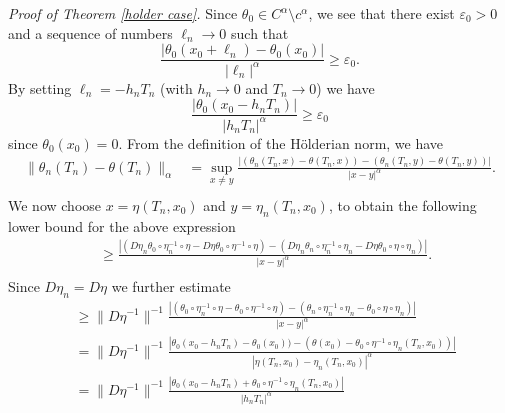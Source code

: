 \documentclass[11pt]{amsart}
\numberwithin{equation}{section}
\begin{document}
\noindent
{\it Proof of Theorem \ref{holder case}.}\quad 
Since   $\theta_0\in  C^\alpha\setminus c^\alpha$, 
we see that 
there exist $\varepsilon_0 >0$ 
and a sequence of numbers 
$\ell_n \to 0$ such that 
% 
\[ 
\frac{\lvert \theta_0(x_0+ \ell_n) - \theta_0(x_0) \rvert} {\lvert \ell_n \rvert^{\alpha}} \ge \varepsilon_0. 
\] 
% 
By setting $\ell_n=-h_nT_n$ 
(with $h_n\to 0$ and $T_n\to 0$) we have
% 
\[ 
\frac{\lvert \theta_0(x_0- h_nT_n)\rvert}{\lvert h_nT_n \rvert^{\alpha}} \ge \varepsilon_0 
\] 
% 
since $\theta_0(x_0)=0$. 
From the definition of the H\"olderian norm, we have  
% 
\begin{equation*} 
\begin{split} 
\|\theta_n(T_n)-\theta(T_n)\|_{\alpha} 
&= 
\sup_{x\not=y} 
\frac{|(\theta_{n}(T_n,x)-\theta(T_n,x))-(\theta_{n}(T_n,y)-\theta(T_n,y))|}{|x-y|^\alpha}. 
\\ 
\end{split} 
\end{equation*} 
% 
We now choose 
$x=\eta(T_n,x_0)$ and $y=\eta_n(T_n,x_0)$, 
to obtain the following lower bound 
for the above expression 
% 
\begin{equation*} 
\begin{split} 
&\geq 
\frac{|(D\eta_n\theta_{0}\circ\eta_n^{-1}\circ\eta-D\eta\theta_0\circ\eta^{-1}\circ\eta)-(D\eta_n\theta_{n}\circ\eta^{-1}_n\circ\eta_n-D\eta\theta_0\circ\eta\circ\eta_n)|}{|x-y|^\alpha}. 
\\
\end{split} 
\end{equation*} 
% 
Since $D\eta_n=D\eta$ we further estimate 
% 
\begin{equation*} 
    \begin{split} 
 &\geq \|D\eta^{-1}\|^{-1}  \frac{|(\theta_{0}\circ\eta_n^{-1}\circ\eta-\theta_0\circ\eta^{-1}\circ\eta)-(\theta_{n}\circ\eta^{-1}_n\circ\eta_n-\theta_0\circ\eta\circ\eta_n)|}{|x-y|^\alpha}\\
& =\|D\eta^{-1}\|^{-1} 
\frac{|\theta_0(x_0-h_{n}T_n)-\theta_0(x_0))-(\theta(x_0)-\theta_0\circ\eta^{-1}\circ\eta_n(T_n,x_0))|}{|\eta(T_n,x_0)-\eta_n(T_n,x_0)|^\alpha} 
\\ 
& 
=\|D\eta^{-1}\|^{-1} 
\frac{|\theta_0(x_0-h_nT_n)+\theta_0\circ\eta^{-1}\circ\eta_n(T_n,x_0)|}{|h_nT_n|^\alpha}
\end{split} 
\end{equation*} 
\end{document}
